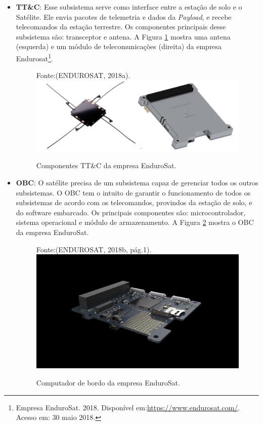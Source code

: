 \begin{itemize}
    \item \textbf{TT\&C}: Esse subsistema serve como interface entre a estação de solo e o Satélite. Ele envia pacotes de telemetria e dados da \textit{Payload}, e recebe telecomandos da estação terrestre. Os componentes principais desse subsistema são: transceptor e antena. A Figura \ref{fig10} mostra uma antena (esquerda) e um módulo de telecomunicações (direita) da empresa Endurosat\footnote{Empresa EnduroSat. 2018. Disponível em:\url{https://www.endurosat.com/}. Acesso em: 30 maio 2018.}.

\begin{figure}[h]
	\centering
    Fonte:(ENDUROSAT, 2018a).\linebreak
	\includegraphics[keepaspectratio=true,scale=2.2]{figuras/tt_c.png}
	\caption{Componentes TT\&C da empresa EnduroSat.}
	\label{fig10}
\end{figure}

\newpage
    \item \textbf{OBC}: O satélite precisa de um subsistema capaz de gerenciar todos os outros subsistemas. O OBC tem o intuito de garantir o funcionamento de todos os subsistemas de acordo com os telecomandos, provindos da estação de solo, e do software embarcado. Os principais componentes são: microcontrolador, sistema operacional e módulo de armazenamento.  A Figura \ref{fig11} mostra o OBC da empresa EnduroSat.

\begin{figure}[h]
	\centering
  	Fonte:(ENDUROSAT, 2018b, pág.1).
	\includegraphics[keepaspectratio=true,scale=0.2]{figuras/Cubesat-OBC-module-1.jpg}
	\caption{Computador de bordo da empresa EnduroSat.}
	\label{fig11}
\end{figure}

\end{itemize}

